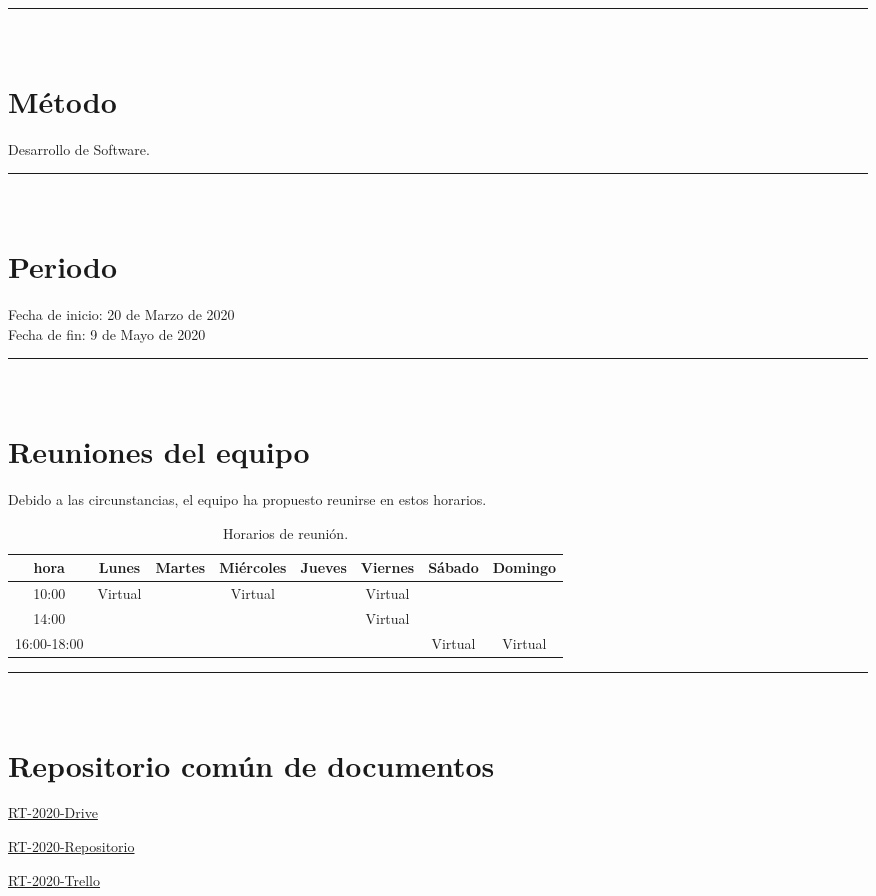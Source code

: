 \documentclass{article}
\begin{document}
\rule{0.8\textwidth}{.8pt}\\

\section*{Método} Desarrollo de Software.


\rule{0.8\textwidth}{.8pt}\\

\section*{Periodo}
Fecha de inicio: 20 de Marzo de 2020\\
\indent Fecha de fin: 9 de Mayo de 2020\\

\rule{0.8\textwidth}{.8pt}\\

\section*{Reuniones del equipo}

Debido a las circunstancias, el equipo ha propuesto reunirse en estos horarios.
\begin{center}
  \begin{table}[H]
    \centering
    \begin{tabular}{| c | c | c | c | c | c | c | c | }
      \hline
      hora & Lunes & Martes & Miércoles & Jueves & Viernes & Sábado & Domingo \\
      \hline
      10:00 & Virtual & & Virtual & & Virtual & & \\ \hline
      14:00 & & & & & Virtual & & \\ \hline
      16:00-18:00 & & & & &  & Virtual & Virtual\\ \hline    
    \end{tabular}
    \caption{Horarios de reunión.}
    \label{tabla:horarios}
  \end{table}
\end{center}

\rule{0.8\textwidth}{.8pt}\\

\section*{Repositorio común de documentos}
\href{https://drive.google.com/open?id=13f9jp3Oli6AQF1Ap8VhoEKFXTPULumos}{RT-2020-Drive}

\href{https://github.com/mildewyPrawn/CafeCiencias}{RT-2020-Repositorio}

\href{https://trello.com/b/rwdAGuSi/cafeciencias}{RT-2020-Trello}
\end{document}
